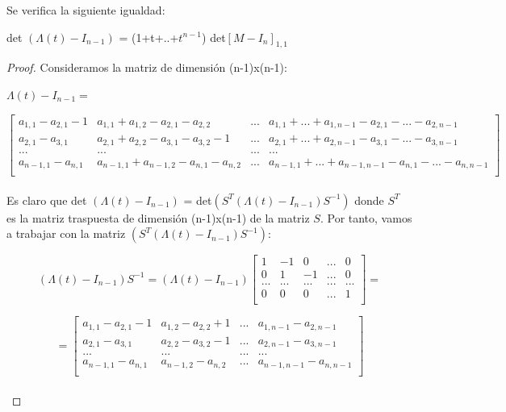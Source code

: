 \documentclass[14pt]{extarticle}
\begin{document}
 \begin{lem}
 	Se verifica la siguiente igualdad:
	 \begin{center}
 		det $(\Lambda(t) - I_{n-1})$ = (1+t+..+$ t^{n-1} $) det$[ M - I_{n}] _{1,1} $
	 \end{center}
	 \begin{proof}
	 	Consideramos la matriz de dimensión (n-1)x(n-1):
	            \begin{center}
	            	$ \Lambda(t) - I_{n-1}= $ 
	            \end{center}	           
	           \[\begin{bmatrix}
	           a_{1,1}-a_{2,1}-1 & a_{1,1}+a_{1,2}-a_{2,1}-a_{2,2} & ... &  a_{1,1}+...+a_{1,n-1}-a_{2,1}-...-a_{2,n-1} \\
	           a_{2,1}-a_{3,1} & a_{2,1}+a_{2,2}-a_{3,1}-a_{3,2}-1&... & a_{2,1}+...+a_{2,n-1}-a_{3,1}-...-a_{3,n-1}  \\
	           ... & ... & ... & ... \\	
	           a_{n-1,1}-a_{n,1} & a_{n-1,1}+a_{n-1,2}-a_{n,1}-a_{n,2} & ... & a_{n-1,1}+...+a_{n-1,n-1}-a_{n,1}-...-a_{n,n-1} \\
	           \end{bmatrix}\]\\
	           
	           Es claro que det $(\Lambda(t) - I_{n-1})$ = det$(S^{T}(\Lambda(t) - I_{n-1})S^{-1})$ donde $S^{T}$ es la matriz traspuesta de dimensión (n-1)x(n-1) de la matriz $S$. Por tanto, vamos a trabajar con la matriz $(S^{T}(\Lambda(t) - I_{n-1})S^{-1})$:
	           
	           \[ (\Lambda(t) - I_{n-1})S^{-1} = (\Lambda(t) - I_{n-1}) \begin{bmatrix}
	           1 & -1 & 0 &... & 0 \\
	           0 & 1 & -1 &...  & 0\\
	           ... & ... & ...& ... & ... \\		
	           0 & 0 & 0 & ... & 1\\
	           \end{bmatrix}=\]
	                
	           \[= \begin{bmatrix}
	           a_{1,1}-a_{2,1}-1 & a_{1,2}-a_{2,2}+1 & ... & a_{1,n-1}-a_{2,n-1}  \\
	           a_{2,1}-a_{3,1} & a_{2,2}-a_{3,2}-1&... &  a_{2,n-1}-a_{3,n-1} \\
	           ... & ... & ... & ... \\	
	           a_{n-1,1}-a_{n,1} & a_{n-1,2}-a_{n,2}&... &  a_{n-1,n-1}-a_{n,n-1} \\
	           \end{bmatrix}\]\\
	           

\end{proof}
\end{lem}
\end{document}
